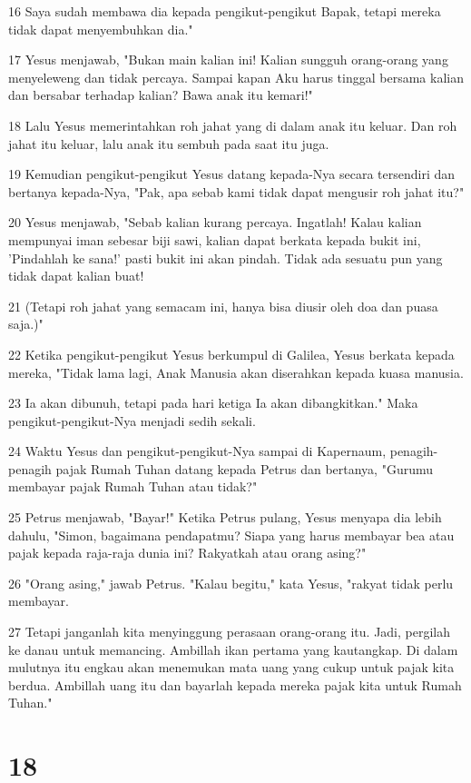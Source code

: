 \par 16 Saya sudah membawa dia kepada pengikut-pengikut Bapak, tetapi mereka tidak dapat menyembuhkan dia."
\par 17 Yesus menjawab, "Bukan main kalian ini! Kalian sungguh orang-orang yang menyeleweng dan tidak percaya. Sampai kapan Aku harus tinggal bersama kalian dan bersabar terhadap kalian? Bawa anak itu kemari!"
\par 18 Lalu Yesus memerintahkan roh jahat yang di dalam anak itu keluar. Dan roh jahat itu keluar, lalu anak itu sembuh pada saat itu juga.
\par 19 Kemudian pengikut-pengikut Yesus datang kepada-Nya secara tersendiri dan bertanya kepada-Nya, "Pak, apa sebab kami tidak dapat mengusir roh jahat itu?"
\par 20 Yesus menjawab, "Sebab kalian kurang percaya. Ingatlah! Kalau kalian mempunyai iman sebesar biji sawi, kalian dapat berkata kepada bukit ini, 'Pindahlah ke sana!' pasti bukit ini akan pindah. Tidak ada sesuatu pun yang tidak dapat kalian buat!
\par 21 (Tetapi roh jahat yang semacam ini, hanya bisa diusir oleh doa dan puasa saja.)"
\par 22 Ketika pengikut-pengikut Yesus berkumpul di Galilea, Yesus berkata kepada mereka, "Tidak lama lagi, Anak Manusia akan diserahkan kepada kuasa manusia.
\par 23 Ia akan dibunuh, tetapi pada hari ketiga Ia akan dibangkitkan." Maka pengikut-pengikut-Nya menjadi sedih sekali.
\par 24 Waktu Yesus dan pengikut-pengikut-Nya sampai di Kapernaum, penagih-penagih pajak Rumah Tuhan datang kepada Petrus dan bertanya, "Gurumu membayar pajak Rumah Tuhan atau tidak?"
\par 25 Petrus menjawab, "Bayar!" Ketika Petrus pulang, Yesus menyapa dia lebih dahulu, "Simon, bagaimana pendapatmu? Siapa yang harus membayar bea atau pajak kepada raja-raja dunia ini? Rakyatkah atau orang asing?"
\par 26 "Orang asing," jawab Petrus. "Kalau begitu," kata Yesus, "rakyat tidak perlu membayar.
\par 27 Tetapi janganlah kita menyinggung perasaan orang-orang itu. Jadi, pergilah ke danau untuk memancing. Ambillah ikan pertama yang kautangkap. Di dalam mulutnya itu engkau akan menemukan mata uang yang cukup untuk pajak kita berdua. Ambillah uang itu dan bayarlah kepada mereka pajak kita untuk Rumah Tuhan."

\chapter{18}

